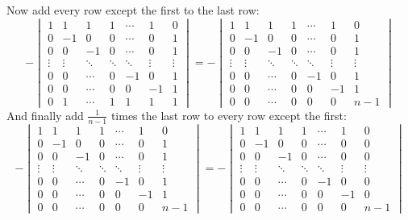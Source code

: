 \documentclass{article}
\begin{document}
\begin{solution}
Now add every row except the first to the last row:
\[
-
\begin{vmatrix}
1 & 1 & 1 & 1 & \cdots & 1 & 0 \\
0 & -1 & 0 & 0 & \cdots & 0 & 1 \\
0 & 0 & -1 & 0 & \cdots & 0 & 1 \\
\vdots & \vdots & \ddots & \ddots & \ddots & \vdots & \vdots \\
0 & 0 & \cdots & 0 & -1 & 0 & 1 \\ 
0 & 0 & \cdots & 0 & 0 & -1 & 1 \\ 
0 & 1 & \cdots & 1 & 1 & 1 & 1 
\end{vmatrix}
= -
\begin{vmatrix}
1 & 1 & 1 & 1 & \cdots & 1 & 0 \\
0 & -1 & 0 & 0 & \cdots & 0 & 1 \\
0 & 0 & -1 & 0 & \cdots & 0 & 1 \\
\vdots & \vdots & \ddots & \ddots & \ddots & \vdots & \vdots \\
0 & 0 & \cdots & 0 & -1 & 0 & 1 \\ 
0 & 0 & \cdots & 0 & 0 & -1 & 1 \\ 
0 & 0 & \cdots & 0 & 0 & 0 & n-1 
\end{vmatrix}
\]
And finally add $\frac{1}{n-1}$ times the last row to every row except the first:
\[-
\begin{vmatrix}
1 & 1 & 1 & 1 & \cdots & 1 & 0 \\
0 & -1 & 0 & 0 & \cdots & 0 & 1 \\
0 & 0 & -1 & 0 & \cdots & 0 & 1 \\
\vdots & \vdots & \ddots & \ddots & \ddots & \vdots & \vdots \\
0 & 0 & \cdots & 0 & -1 & 0 & 1 \\ 
0 & 0 & \cdots & 0 & 0 & -1 & 1 \\ 
0 & 0 & \cdots & 0 & 0 & 0 & n-1 
\end{vmatrix}
= -
\begin{vmatrix}
1 & 1 & 1 & 1 & \cdots & 1 & 0 \\
0 & -1 & 0 & 0 & \cdots & 0 & 0 \\
0 & 0 & -1 & 0 & \cdots & 0 & 0 \\
\vdots & \vdots & \ddots & \ddots & \ddots & \vdots & \vdots \\
0 & 0 & \cdots & 0 & -1 & 0 & 0 \\ 
0 & 0 & \cdots & 0 & 0 & -1 & 0 \\ 
0 & 0 & \cdots & 0 & 0 & 0 & n-1 
\end{vmatrix}
\]


\end{solution}
\end{document}
